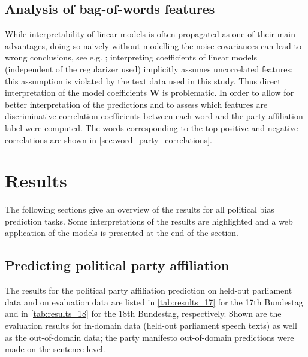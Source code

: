 \documentclass{article}
\renewcommand{\vec}[1]{\mathbf{#1}}
\begin{document}
\subsection{Analysis of bag-of-words features}\label{sec:correlations_methods}
While interpretability of linear models is often propagated as one of their main advantages, doing so naively without modelling the noise covariances can lead to wrong conclusions, see e.g. \cite{Zien2009, Haufe2013}; interpreting coefficients of linear models (independent of the regularizer used) implicitly assumes uncorrelated features; this assumption is violated by the text data used in this study. Thus direct interpretation of the model coefficients $\vec{W}$ is problematic. In order to allow for better interpretation of the predictions and to assess which features are discriminative correlation coefficients between each word and the party affiliation label were computed. The words corresponding to the top positive and negative correlations are shown in \autoref{sec:word_party_correlations}.

\section{Results}\label{sec:results}

The following sections give an overview of the results for all political bias prediction tasks. Some interpretations of the results are highlighted and a web application of the models is presented at the end of the section.

\subsection{Predicting political party affiliation}
The results for the political party affiliation prediction on held-out parliament data and on evaluation data are listed in \autoref{tab:results_17} for the 17th Bundestag and in \autoref{tab:results_18} for the 18th Bundestag, respectively. 
Shown are the evaluation results for in-domain data (held-out parliament speech texts) as well as the out-of-domain data; the party manifesto out-of-domain predictions were made on the sentence level. 
\end{document}
